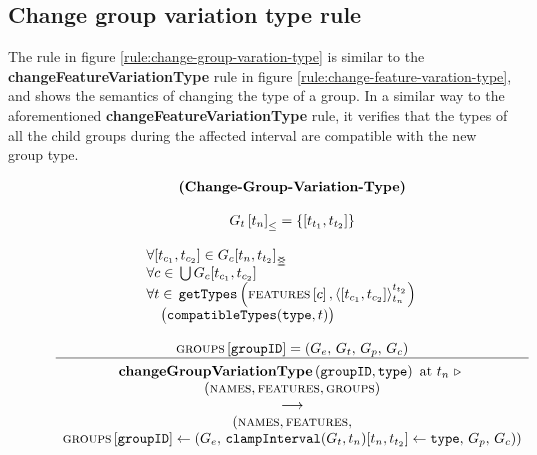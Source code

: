 \subsection{Change group variation type rule}
\label{sub:change-group-variation-type-rule}
The rule in figure \vref{rule:change-group-varation-type} is similar to the \textbf{changeFeatureVariationType} rule in figure \vref{rule:change-feature-varation-type}, and shows the semantics of changing the type of a group. In a similar way to the aforementioned \textbf{changeFeatureVariationType} rule, it verifies that the types of all the child groups during the affected interval are compatible with the new group type.

\begin{figure}
    \renewcommand{\arraystretch}{1.1}
    \sossize$$\begin{array}{c}
      \ntyperule{Change-Group-Variation-Type}
      {\\
        \containing{G_t}{t_n} = \set{\interval{t_{t_1}}{t_{t_2}}} %
        \\
        \\
        \qqquad \qqquad \forall \interval{t_{c_1}}{t_{c_2}} \in \overlapping{G_c}{t_n}{t_{t_2}}\hfill\\ %
        \qqquad \qqquad\forall c \in \, \bigcup G_c \interval{t_{c_1}}{t_{c_2}}\hfill\\ %
        \qqquad \qqquad\forall t \in \, \var{getTypes}\left(\lookup{\features}{c}, \clamp{\interval{t_{c_1}}{t_{c_2}}}{t_n}{t_{t_2}}\right)\hfill \\ %
        \qqquad \qqquad \quad \big(\var{compatibleTypes}(\var{type}, t)\big)\hfill\\
         \\

        \lookup{\groups{}}{\var{groupID}} = \left( G_e,\, G_t,\, G_p,\, G_c \right)
      }
      {
        \textbf{changeGroupVariationType}\left( \var{groupID}, \var{type}\right) \text{ at } t_n \shove \\
        (\names{}, \features{}, \groups{}) \\
        \transition \\
        (\names{}, \features{}, \\
        \lookup{\groups{}}{\var{groupID}} \assign \left( G_e,\, \var{clampInterval}(G_t, t_n) \interval{t_n}{t_{t_2}} \assign \var{type},\, G_p,\, G_c \right))
      }
    \end{array}$$
  \caption{\label{rule:change-group-varation-type}}
\end{figure}

